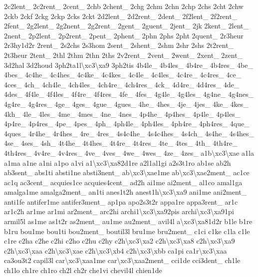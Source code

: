 {2c2lent\-\_\- 2c2rent\-\_\- 2cent\-\_\- 2chb 2chent\-\_\- 2chg 2chm 2chn 2chp 2chs 2cht 2chw 2ckb 2ckf 2ckg 2ckp 2cks 2ckt 2d2lent\-\_\- 2d2rent\-\_\- 2dent\-\_\- 2f2lent\-\_\- 2f2rent\-\_\- 2fent\-\_\- 2g2lent\-\_\- 2g2nent\-\_\- 2g2rent\-\_\- 2gent\-\_\- 2guent\-\_\- 2jent\-\_\- 2jk 2kent\-\_\- 2lent\-\_\- 2nent\-\_\- 2p2lent\-\_\- 2p2rent\-\_\- 2pent\-\_\- 2phent\-\_\- 2phn 2phs 2pht 2quent\-\_\- 2r3heur 2r3hy1d2r 2rent\-\_\- 2s2chs 2s3hom 2sent\-\_\- 2shent\-\_\- 2shm 2shr 2shs 2t2rent\-\_\- 2t3heur 2tent\-\_\- 2thl 2thm 2thn 2ths 2v2rent\-\_\- 2vent\-\_\- 2went\-\_\- 2xent\-\_\- 2zent\-\_\- 3d2hal 3d2houd 3ph2ta1l\textbackslash{}xc3\textbackslash{}xa9 3ph2tis 4b4le\-\_\- 4b4les\-\_\- 4b4re\-\_\- 4b4res\-\_\- 4be\-\_\- 4bes\-\_\- 4c4he\-\_\- 4c4hes\-\_\- 4c4ke\-\_\- 4c4kes\-\_\- 4c4le\-\_\- 4c4les\-\_\- 4c4re\-\_\- 4c4res\-\_\- 4ce\-\_\- 4ces\-\_\- 4ch\-\_\- 4ch4le\-\_\- 4ch4les\-\_\- 4ch4re\-\_\- 4ch4res\-\_\- 4ck\-\_\- 4d4re\-\_\- 4d4res\-\_\- 4de\-\_\- 4des\-\_\- 4f4le\-\_\- 4f4les\-\_\- 4f4re\-\_\- 4f4res\-\_\- 4fe\-\_\- 4fes\-\_\- 4g4le\-\_\- 4g4les\-\_\- 4g4ne\-\_\- 4g4nes\-\_\- 4g4re\-\_\- 4g4res\-\_\- 4ge\-\_\- 4ges\-\_\- 4gue\-\_\- 4gues\-\_\- 4he\-\_\- 4hes\-\_\- 4je\-\_\- 4jes\-\_\- 4ke\-\_\- 4kes\-\_\- 4kh\-\_\- 4le\-\_\- 4les\-\_\- 4me\-\_\- 4mes\-\_\- 4ne\-\_\- 4nes\-\_\- 4p4he\-\_\- 4p4hes\-\_\- 4p4le\-\_\- 4p4les\-\_\- 4p4re\-\_\- 4p4res\-\_\- 4pe\-\_\- 4pes\-\_\- 4ph\-\_\- 4ph4le\-\_\- 4ph4les\-\_\- 4ph4re\-\_\- 4ph4res\-\_\- 4que\-\_\- 4ques\-\_\- 4r4he\-\_\- 4r4hes\-\_\- 4re\-\_\- 4res\-\_\- 4s4c4he\-\_\- 4s4c4hes\-\_\- 4s4ch\-\_\- 4s4he\-\_\- 4s4hes\-\_\- 4se\-\_\- 4ses\-\_\- 4sh\-\_\- 4t4he\-\_\- 4t4hes\-\_\- 4t4re\-\_\- 4t4res\-\_\- 4te\-\_\- 4tes\-\_\- 4th\-\_\- 4th4re\-\_\- 4th4res\-\_\- 4v4re\-\_\- 4v4res\-\_\- 4ve\-\_\- 4ves\-\_\- 4we\-\_\- 4wes\-\_\- 4ze\-\_\- 4zes\-\_\- a1b\textbackslash{}xc3\textbackslash{}xae a1la a1ma a1ne a1ni a1po a1vi a1\textbackslash{}xc3\textbackslash{}xa82d1re a2l1al1gi a2s3t1ro ab1se ab2h ab3sent\-\_\- abs1ti absti1ne absti3nent\-\_\- ab\textbackslash{}xc3\textbackslash{}xae1me ab\textbackslash{}xc3\textbackslash{}xae2ment\-\_\- ac1ce ac1q ac3cent\-\_\- acquies1ce acquies4cent\-\_\- ad2h ai1me ai2ment\-\_\- al1co amal1ga amalga1me amalga2ment\-\_\- an1ti anes1t2h anest1h\textbackslash{}xc3\textbackslash{}xa9 ani1me ani2ment\-\_\- anti1fe antifer1me antifer3ment\-\_\- ap1pa apo2s3t2r appa1re appa3rent\-\_\- ar1c ar1c2h ar1me ar1mi ar2ment\-\_\- arc2hi archi1\textbackslash{}xc3\textbackslash{}xa92pis archi\textbackslash{}xc3\textbackslash{}xa91pi armil5l as1me as1t2r as2ment\-\_\- au1me au2ment\-\_\- avil4l a\textbackslash{}xc3\textbackslash{}xa81d2r b1le b1re b1ru bou1me bou1ti bou2ment\-\_\- boutil3l bru1me bru2ment\-\_\- c1ci c1ke c1la c1le c1re c2ha c2he c2hi c2ho c2hu c2hy c2h\textbackslash{}xc3\textbackslash{}xa2 c2h\textbackslash{}xc3\textbackslash{}xa8 c2h\textbackslash{}xc3\textbackslash{}xa9 c2h\textbackslash{}xc3\textbackslash{}xaa c2h\textbackslash{}xc3\textbackslash{}xae c2h\textbackslash{}xc3\textbackslash{}xb4 c2h\textbackslash{}xc3\textbackslash{}xbb ca1pi ca1r\textbackslash{}xc3\textbackslash{}xaa ca3ou3t2 capil3l car\textbackslash{}xc3\textbackslash{}xaa1me car\textbackslash{}xc3\textbackslash{}xaa2ment\-\_\- cci1de cci3dent\-\_\- ch1le ch1lo ch1re ch1ro ch2l ch2r che1vi chevil4l chien1de }
